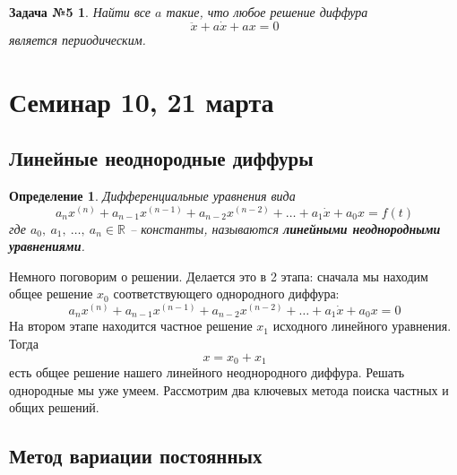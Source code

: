 \documentclass[a4paper,12pt]{article}
\newtheorem{definition}{Определение}
\newtheorem*{task5}{Задача №5}
\newcommand{\R}{\mathbb{R}}
\newcommand{\dx}{\dot{x}}
\newcommand{\ddx}{\ddot{x}}
\begin{document}
\begin{task5}
Найти все $a$ такие, что любое решение диффура \[\ddx + a\dx + ax = 0\] является периодическим.
\end{task5}
%	

\newpage
\section{Семинар 10, 21 марта}

\subsection{Линейные неоднородные диффуры}

\begin{definition}
	Дифференциальные уравнения вида
	\[a_nx^{(n)} + a_{n - 1}x^{(n - 1)} + a_{n - 2}x^{(n - 2)} + \ldots + a_1\dx + a_0 x = f(t)\]
	где $a_0,\ a_1,\ \ldots,\ a_n \in \R$ -- константы, называются \textbf{линейными неоднородными уравнениями}.
\end{definition}
Немного поговорим о решении. Делается это в 2 этапа: сначала мы находим общее решение $x_0$ соответствующего однородного диффура:
\[a_nx^{(n)} + a_{n - 1}x^{(n - 1)} + a_{n - 2}x^{(n - 2)} + \ldots + a_1\dx + a_0 x = 0\]
На втором этапе находится частное решение $x_1$ исходного линейного уравнения. Тогда
\[x = x_0 + x_1\]
есть общее решение нашего линейного неоднородного диффура. Решать однородные мы уже умеем. Рассмотрим два ключевых метода поиска частных и общих решений. 

\subsection{Метод вариации постоянных}
\end{document}
